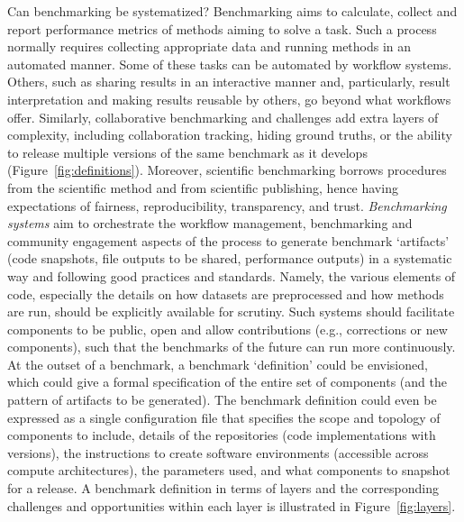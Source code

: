 \documentclass[11pt]{article}
\begin{document}
Can benchmarking be systematized? Benchmarking aims to calculate, collect and report performance metrics of methods aiming to solve a task. Such a process normally requires collecting appropriate data and running methods in an automated manner. Some of these tasks can be automated by workflow systems. Others, such as sharing results in an interactive manner and, particularly, result interpretation and making results reusable by others, go beyond what workflows offer. Similarly, collaborative benchmarking and challenges add extra layers of complexity, including collaboration tracking, hiding ground truths, or the ability to release multiple versions of the same benchmark as it develops (Figure~\ref{fig:definitions}). Moreover, scientific benchmarking borrows procedures from the scientific method and from scientific publishing, hence having expectations of fairness, reproducibility, transparency, and trust. \emph{Benchmarking systems} aim to orchestrate the workflow management, benchmarking and community engagement aspects of the process to generate benchmark `artifacts' (code snapshots, file outputs to be shared, performance outputs) in a systematic way and following good practices and standards. Namely,  the various elements of code, especially the details on how datasets are preprocessed and how methods are run, should be explicitly available for scrutiny. Such systems should facilitate components to be public, open and allow contributions (e.g., corrections or new components), such that the benchmarks of the future can run more continuously. At the outset of a benchmark, a benchmark `definition' could be envisioned, which could give a formal specification of the entire set of components (and the pattern of artifacts to be generated). The benchmark definition could even be expressed as a single configuration file that specifies the scope and topology of components to include, details of the repositories (code implementations with versions), the instructions to create software environments (accessible across compute architectures), the parameters used, and what components to snapshot for a release. A benchmark definition in terms of layers and the corresponding challenges and opportunities within each layer is illustrated in Figure~\ref{fig:layers}.  
\end{document}
